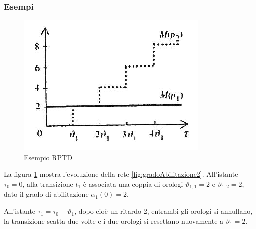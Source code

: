 \documentclass[a4paper]{report}
\begin{document}
\subsubsection{Esempi}
\begin{figure}[!hbp]
  \begin{center}
    \includegraphics[scale=0.5]{./images/petriEsempio01.png}
    \caption{Esempio RPTD}
    \label{fig:petriEsempio01}
  \end{center}
\end{figure}
La figura \ref{fig:petriEsempio01} mostra l'evoluzione della rete
\ref{fig:gradoAbilitazione2}. All'istante $\tau_0 = 0$, alla
transizione $t_1$ \`e associata una coppia di orologi $\vartheta_{1,1}
= 2$ e $\vartheta_{1,2} = 2$, dato il grado di abilitazione
$\alpha_1(0) = 2$.

All'istante $\tau_1 = \tau_0 + \vartheta_1$, dopo cio\`e un ritardo 2,
entrambi gli orologi si annullano, la transizione scatta due volte e i
due orologi si resettano nuovamente a $\vartheta_1 = 2$.
\end{document}
